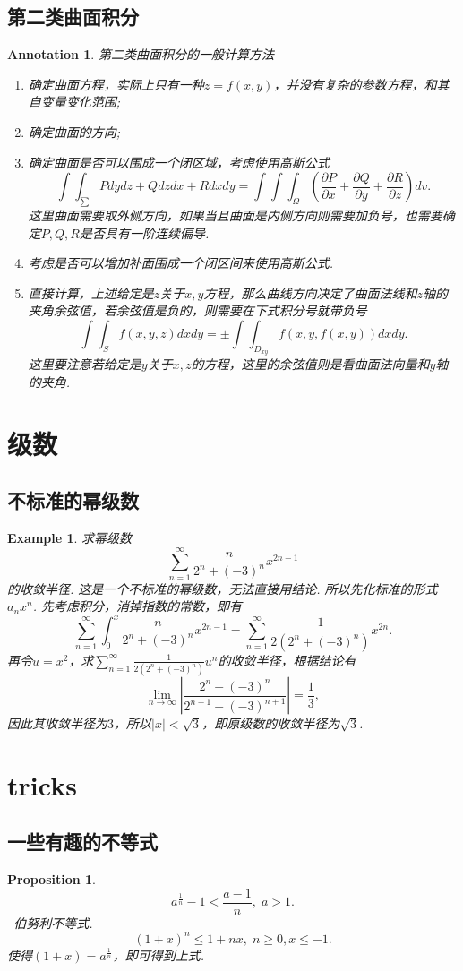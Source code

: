 \documentclass{article}
\newtheorem{proposition}[theorem]{Proposition}
\newtheorem{example}[theorem]{Example}
\newtheorem{annotation}[theorem]{Annotation}
\newcommand{\hints}{{\color{blue} \text{hints}}}
\begin{document}
\subsection{第二类曲面积分}

\begin{annotation}
\rm 第二类曲面积分的一般计算方法
\begin{enumerate}
	\item 确定曲面方程，实际上只有一种$z=f(x,y)$，并没有复杂的参数方程，和其自变量变化范围; 
	\item 确定曲面的方向;
	\item 确定曲面是否可以围成一个闭区域，考虑使用高斯公式
	$$
	\int\int_\sum Pdydz + Qdzdx + Rdxdy = \int\int\int_\Omega (\frac{\partial P}{\partial x}+\frac{\partial Q}{\partial y}+\frac{\partial R}{\partial z})dv.
	$$
	这里曲面需要取外侧方向，如果当且曲面是内侧方向则需要加负号，也需要确定$P,Q,R$是否具有一阶连续偏导. 
	\item 考虑是否可以增加补面围成一个闭区间来使用高斯公式. 
	\item 直接计算，上述给定是$z$关于$x,y$方程，那么曲线方向决定了曲面法线和$z$轴的夹角余弦值，若余弦值是负的，则需要在下式积分号就带负号
	$$
	\int\int_{S} f(x,y,z)dxdy = \pm \int\int_{D_{xy}} f(x,y,f(x,y))dxdy.
	$$
	这里要注意若给定是$y$关于$x,z$的方程，这里的余弦值则是看曲面法向量和$y$轴的夹角. 
\end{enumerate}
\end{annotation}

\newpage
\section{级数}

\subsection{不标准的幂级数}

\begin{example}
\rm 求幂级数
$$
\sum\limits_{n=1}^\infty \frac{n}{2^n + (-3)^n}x^{2n-1}
$$
的收敛半径. 
\hints 这是一个不标准的幂级数，无法直接用结论. 所以先化标准的形式$a_nx^n$. 先考虑积分，消掉指数的常数，即有
$$
\sum\limits_{n=1}^\infty \int_0^{x} \frac{n}{2^n + (-3)^n}x^{2n-1} = \sum\limits_{n=1}^\infty \frac{1}{2(2^n + (-3)^n)}x^{2n}.
$$
再令$u = x^2$，求$ \sum\limits_{n=1}^\infty \frac{1}{2(2^n + (-3)^n)}u^{n}$的收敛半径，根据结论有
$$
\lim\limits_{n \to \infty} \left| \frac{2^n+(-3)^n}{2^{n+1}+(-3)^{n+1}}\right| = \frac{1}{3},
$$
因此其收敛半径为$3$，所以$|x| <\sqrt{3}$，即原级数的收敛半径为$\sqrt{3}$. 
\end{example}

\newpage
\section{tricks}

\subsection{一些有趣的不等式}

\begin{proposition}\label{prop: bonuli}
$$
a^{\frac{1}{n}}-1 < \frac{a-1}{n},\; a > 1.
$$
\hints\ {\color{red}伯努利不等式}.
$$
(1+x)^n \leq 1 + nx, \; n \geq 0, x \leq -1.
$$
使得$(1+x) = a^{\frac{1}{n}}$，即可得到上式.
\end{proposition}
\end{document}
